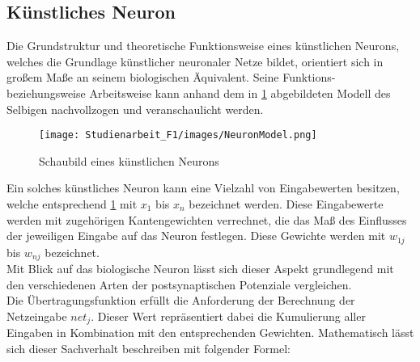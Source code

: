 \subsection{Künstliches Neuron}
\label{künstliches_neuron}
Die Grundstruktur und theoretische Funktionsweise eines künstlichen Neurons, welches die Grundlage künstlicher neuronaler Netze bildet, orientiert sich in großem Maße an seinem biologischen Äquivalent. Seine Funktions- beziehungsweise Arbeitsweise kann anhand dem in \ref{fig:technicalneuron} abgebildeten Modell des Selbigen nachvollzogen und veranschaulicht werden.
\begin{figure}[H]
    \centering
    \texttt{[image: Studienarbeit\_F1/images/NeuronModel.png]}
    \caption[Schaubild eines künstlichen Neurons]{Schaubild eines künstlichen Neurons\footnotemark}
    \label{fig:technicalneuron}
\end{figure}
Ein solches künstliches Neuron kann eine Vielzahl von Eingabewerten besitzen, welche entsprechend \ref{fig:technicalneuron} mit $x_1$ bis $x_n$ bezeichnet werden. Diese Eingabewerte werden mit zugehörigen Kantengewichten verrechnet, die das Maß des Einflusses der jeweiligen Eingabe auf das Neuron festlegen. Diese Gewichte werden mit $w_{1j}$ bis $w_{nj}$ bezeichnet.\\
Mit Blick auf das biologische Neuron lässt sich dieser Aspekt grundlegend mit den verschiedenen Arten der postsynaptischen Potenziale vergleichen.\\
Die Übertragungsfunktion erfüllt die Anforderung der Berechnung der Netzeingabe $net_j$. Dieser Wert repräsentiert dabei die Kumulierung aller Eingaben in Kombination mit den entsprechenden Gewichten. Mathematisch lässt sich dieser Sachverhalt beschreiben mit folgender Formel:\\
